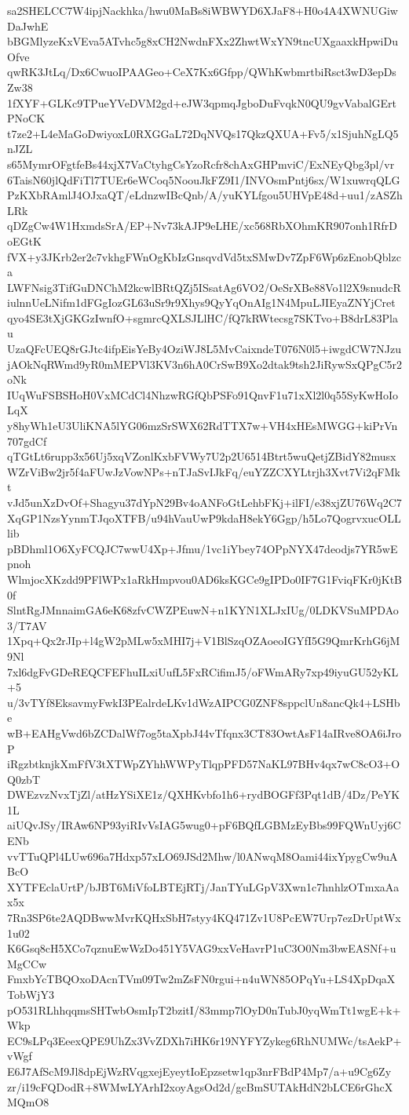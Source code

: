 sa2SHELCC7W4ipjNackhka/hwu0MaBs8iWBWYD6XJaF8+H0o4A4XWNUGiwDaJwhE
bBGMlyzeKxVEva5ATvhc5g8xCH2NwdnFXx2ZhwtWxYN9tncUXgaaxkHpwiDuOfve
qwRK3JtLq/Dx6CwuoIPAAGeo+CeX7Kx6Gfpp/QWhKwbmrtbiRsct3wD3epDsZw38
1fXYF+GLKc9TPueYVeDVM2gd+eJW3qpmqJgboDuFvqkN0QU9gvVabalGErtPNoCK
t7ze2+L4eMaGoDwiyoxL0RXGGaL72DqNVQs17QkzQXUA+Fv5/x1SjuhNgLQ5nJZL
s65MymrOFgtfeBs44xjX7VaCtyhgCsYzoRcfr8chAxGHPmviC/ExNEyQbg3pl/vr
6TaisN60jlQdFiTl7TUEr6eWCoq5NoouJkFZ9I1/INVOsmPntj6sx/W1xuwrqQLG
PzKXbRAmlJ4OJxaQT/eLdnzwIBcQnb/A/yuKYLfgou5UHVpE48d+uu1/zASZhLRk
qDZgCw4W1HxmdsSrA/EP+Nv73kAJP9eLHE/xc568RbXOhmKR907onh1RfrDoEGtK
fVX+y3JKrb2er2c7vkhgFWnOgKbIzGnsqvdVd5txSMwDv7ZpF6Wp6zEnobQblzca
LWFNsig3TifGuDNChM2kcwlBRtQZj5ISsatAg6VO2/OeSrXBe88Vo1l2X9snudcR
iulnnUeLNifm1dFGgIozGL63uSr9r9Xhys9QyYqOnAIg1N4MpuLJIEyaZNYjCret
qyo4SE3tXjGKGzIwnfO+sgmrcQXLSJLlHC/fQ7kRWtecsg7SKTvo+B8drL83Plau
UzaQFcUEQ8rGJtc4ifpEisYeBy4OziWJ8L5MvCaixndeT076N0l5+iwgdCW7NJzu
jAOkNqRWmd9yR0mMEPVl3KV3n6hA0CrSwB9Xo2dtak9tsh2JiRywSxQPgC5r2oNk
IUqWuFSBSHoH0VxMCdCl4NhzwRGfQbPSFo91QnvF1u71xXl2l0q55SyKwHoIoLqX
y8hyWh1eU3UliKNA5lYG06mzSrSWX62RdTTX7w+VH4xHEsMWGG+kiPrVn707gdCf
qTGtLt6rupp3x56Uj5xqVZonlKxbFVWy7U2p2U6514Btrt5wuQetjZBidY82musx
WZrViBw2jr5f4aFUwJzVowNPs+nTJaSvIJkFq/euYZZCXYLtrjh3Xvt7Vi2qFMkt
vJd5unXzDvOf+Shagyu37dYpN29Bv4oANFoGtLehbFKj+ilFI/e38xjZU76Wq2C7
XqGP1NzsYynmTJqoXTFB/u94hVauUwP9kdaH8ekY6Ggp/h5Lo7QogrvxucOLLlib
pBDhml1O6XyFCQJC7wwU4Xp+Jfmu/1vc1iYbey74OPpNYX47deodjs7YR5wEpnoh
WlmjocXKzdd9PFlWPx1aRkHmpvou0AD6ksKGCe9gIPDo0IF7G1FviqFKr0jKtB0f
SlntRgJMnnaimGA6eK68zfvCWZPEuwN+n1KYN1XLJxIUg/0LDKVSuMPDAo3/T7AV
1Xpq+Qx2rJIp+l4gW2pMLw5xMHI7j+V1BlSzqOZAoeoIGYfI5G9QmrKrhG6jM9Nl
7xl6dgFvGDeREQCFEFhuILxiUufL5FxRCifimJ5/oFWmARy7xp49iyuGU52yKL+5
u/3vTYf8EksavmyFwkI3PEalrdeLKv1dWzAIPCG0ZNF8sppclUn8ancQk4+LSHbe
wB+EAHgVwd6bZCDalWf7og5taXpbJ44vTfqnx3CT83OwtAsF14aIRve8OA6iJroP
iRgzbtknjkXmFfV3tXTWpZYhhWWPyTlqpPFD57NaKL97BHv4qx7wC8cO3+OQ0zbT
DWEzvzNvxTjZl/atHzYSiXE1z/QXHKvbfo1h6+rydBOGFf3Pqt1dB/4Dz/PeYK1L
aiUQvJSy/IRAw6NP93yiRIvVsIAG5wug0+pF6BQfLGBMzEyBbs99FQWnUyj6CENb
vvTTuQPl4LUw696a7Hdxp57xLO69JSd2Mhw/l0ANwqM8Oami44ixYpygCw9uABcO
XYTFEclaUrtP/bJBT6MiVfoLBTEjRTj/JanTYuLGpV3Xwn1c7hnhlzOTmxaAax5x
7Rn3SP6te2AQDBwwMvrKQHxSbH7styy4KQ471Zv1U8PcEW7Urp7ezDrUptWx1u02
K6Gsq8cH5XCo7qznuEwWzDo451Y5VAG9xxVeHavrP1uC3O0Nm3bwEASNf+uMgCCw
FmxbYcTBQOxoDAcnTVm09Tw2mZsFN0rgui+n4uWN85OPqYu+LS4XpDqaXTobWjY3
pO531RLhhqqmsSHTwbOsmIpT2bzitI/83mmp7lOyD0nTubJ0yqWmTt1wgE+k+Wkp
EC9sLPq3EeexQPE9UhZx3VvZDXh7iHK6r19NYFYZykeg6RhNUMWc/tsAekP+vWgf
E6J7AfScM9Jl8dpEjWzRVqgxejEyeytIoEpzsetw1qp3nrFBdP4Mp7/a+u9Cg6Zy
zr/i19cFQDodR+8WMwLYArhI2xoyAgsOd2d/gcBmSUTAkHdN2bLCE6rGhcXMQmO8
